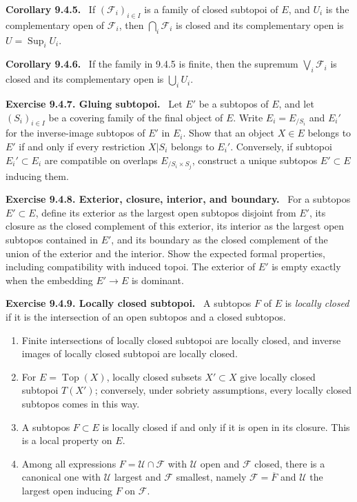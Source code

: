 \documentclass[11pt]{article}
\newcommand{\Uu}{\mathcal{U}}
\newcommand{\Ff}{\mathcal{F}}
\newcommand{\Top}{\operatorname{Top}}
\newcommand{\Sup}{\operatorname{Sup}}
\newenvironment{statement}[1]{\par\medskip\noindent\textbf{#1.}\ }{\par\medskip}
\newenvironment{remarktext}[1]{\par\medskip\noindent\textbf{#1.}\ }{\par\medskip}
\begin{document}
\begin{statement}{Corollary 9.4.5}
If \((\Ff_i)_{i\in I}\) is a family of closed subtopoi of \(E\), and \(U_i\) is the complementary open of \(\Ff_i\), then \(\bigcap_i\Ff_i\) is closed and its complementary open is \(U=\Sup_i U_i\).
\end{statement}

\begin{statement}{Corollary 9.4.6}
If the family in 9.4.5 is finite, then the supremum \(\bigvee_i\Ff_i\) is closed and its complementary open is \(\bigcup_iU_i\).
\end{statement}

\begin{remarktext}{Exercise 9.4.7. Gluing subtopoi}
Let \(E'\) be a subtopos of \(E\), and let \((S_i)_{i\in I}\) be a covering family of the final object of \(E\). Write \(E_i=E_{/S_i}\) and \(E_i'\) for the inverse-image subtopos of \(E'\) in \(E_i\). Show that an object \(X\in E\) belongs to \(E'\) if and only if every restriction \(X|S_i\) belongs to \(E_i'\). Conversely, if subtopoi \(E_i'\subset E_i\) are compatible on overlaps \(E_{/S_i\times S_j}\), construct a unique subtopos \(E'\subset E\) inducing them.
\end{remarktext}

\begin{remarktext}{Exercise 9.4.8. Exterior, closure, interior, and boundary}
For a subtopos \(E'\subset E\), define its exterior as the largest open subtopos disjoint from \(E'\), its closure as the closed complement of this exterior, its interior as the largest open subtopos contained in \(E'\), and its boundary as the closed complement of the union of the exterior and the interior. Show the expected formal properties, including compatibility with induced topoi. The exterior of \(E'\) is empty exactly when the embedding \(E'\to E\) is dominant.
\end{remarktext}

\begin{remarktext}{Exercise 9.4.9. Locally closed subtopoi}
A subtopos \(F\) of \(E\) is \emph{locally closed} if it is the intersection of an open subtopos and a closed subtopos.
\begin{enumerate}[label=\alph*)]
\item Finite intersections of locally closed subtopoi are locally closed, and inverse images of locally closed subtopoi are locally closed.
\item For \(E=\Top(X)\), locally closed subsets \(X'\subset X\) give locally closed subtopoi \(T(X')\); conversely, under sobriety assumptions, every locally closed subtopos comes in this way.
\item A subtopos \(F\subset E\) is locally closed if and only if it is open in its closure. This is a local property on \(E\).
\item Among all expressions \(F=\Uu\cap\Ff\) with \(\Uu\) open and \(\Ff\) closed, there is a canonical one with \(\Uu\) largest and \(\Ff\) smallest, namely \(\Ff=\overline F\) and \(\Uu\) the largest open inducing \(F\) on \(\Ff\).
\end{enumerate}
\end{remarktext}
\end{document}
